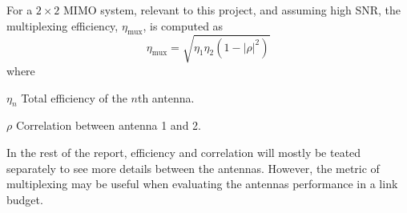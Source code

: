 For a $2\times2$ MIMO system, relevant to this project, and assuming high SNR, the multiplexing efficiency, $\eta_{\text{mux}}$, is computed as \cite{tian2011multiplexing}
\begin{equation}
    \eta_{\text{mux}} = \sqrt{\eta_1 \eta_2 (1 - |\rho|^2)}
\end{equation}
where
\begin{where}
\item[$\eta_n$] Total efficiency of the $n$th antenna.
\item[$\rho$] Correlation between antenna 1 and 2.
\end{where}

In the rest of the report, efficiency and correlation will mostly be teated separately to see more details between the antennas. However, the metric of multiplexing may be useful when evaluating the antennas performance in a link budget.
